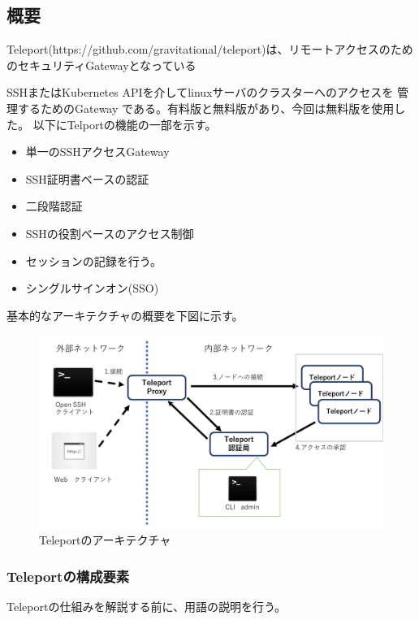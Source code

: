 \documentclass[11pt,a4j,titlepage]{jreport}
\begin{document}
\subsection*{概要}
Teleport(https://github.com/gravitational/teleport)は、リモートアクセスのためのセキュリティGatewayとなっている


SSHまたはKubernetes APIを介してlinuxサーバのクラスターへのアクセスを
管理するためのGateway である。有料版と無料版があり、今回は無料版を使用した。
以下にTelportの機能の一部を示す。

\begin{itemize}
    \item 単一のSSHアクセスGateway
    \item SSH証明書ベースの認証
    \item 二段階認証
    \item SSHの役割ベースのアクセス制御
    \item セッションの記録を行う。
    \item シングルサインオン(SSO)
\end{itemize}

基本的なアーキテクチャの概要を下図に示す。
\begin{figure}[H]
    \centering
    \includegraphics*[width=1.0\textwidth,page=1]{graphs/teleport_archtecture.pdf}
    \caption{Teleportのアーキテクチャ}
    \label{teleport_archtecture}
\end{figure}


\subsubsection*{Teleportの構成要素}
Teleportの仕組みを解説する前に、用語の説明を行う。


    
        
\end{document}
